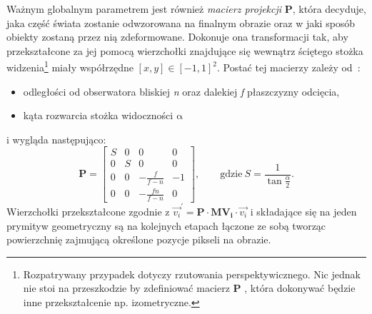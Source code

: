 Ważnym globalnym parametrem jest również \textit{macierz projekcji} $\mathbf{P}$, która decyduje, jaka część świata zostanie odwzorowana na finalnym obrazie oraz w jaki sposób obiekty zostaną przez nią zdeformowane. Dokonuje ona transformacji tak, aby przekształcone za jej pomocą wierzchołki znajdujące się wewnątrz ściętego stożka widzenia\footnote{Rozpatrywany przypadek dotyczy rzutowania perspektywicznego. Nic jednak nie stoi na przeszkodzie by zdefiniować macierz $\mathbf{P}$ , która dokonywać będzie inne przekształcenie np. izometryczne.} miały współrzędne $[x,y] \in [-1, 1]^2$. Postać tej macierzy zależy od~\cite{PerspectiveMatrix}:
\begin{itemize}
\item odległości od obserwatora bliskiej \textit{n} oraz dalekiej \textit{f} płaszczyzny odcięcia,
\item kąta rozwarcia stożka widoczności $\mathrm{\alpha}$
\end{itemize}
i wygląda następująco:
\begin{equation}
\mathbf{P} = 
\begin{bmatrix}
S & 0 & 0 & 0 \\ 
0 & S & 0 & 0 \\ 
0 & 0 & -\frac{f}{f-n} & -1\\ 
0 & 0 & -\frac{fn}{f-n} & 0
\end{bmatrix},\qquad \mathrm{gdzie\ }S = \frac{1}{\tan\frac{\alpha}{2}}.
\end{equation}
Wierzchołki przekształcone zgodnie z $\vec{v_{i}}^{'} = \mathbf{P}\cdot\mathbf{MV_i}\cdot \vec{v_i}$ i składające się na jeden prymityw geometryczny są na kolejnych etapach łączone ze sobą tworząc powierzchnię zajmującą określone pozycje pikseli na obrazie. 
